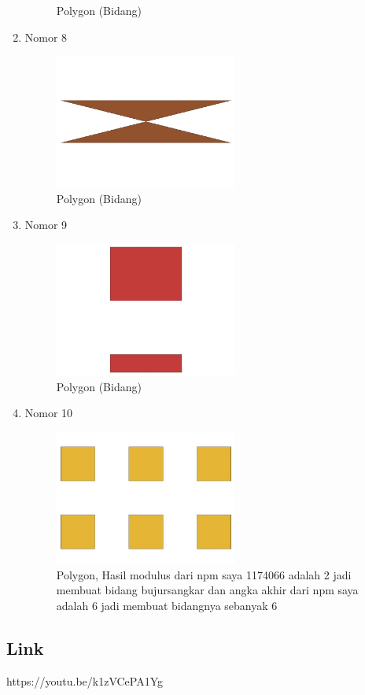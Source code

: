 \begin{enumerate}
\begin{figure}[H]
		\centering
		\caption{Polygon (Bidang)}
	\end{figure}
	\item Nomor 8
	
	\begin{figure}[H]
		\includegraphics[width=6cm]{figures/Tugas2/1174066/No8.jpeg}
		\centering
		\caption{Polygon (Bidang)}
	\end{figure}
	\item Nomor 9
	
	\begin{figure}[H]
		\includegraphics[width=6cm]{figures/Tugas2/1174066/No9.jpeg}
		\centering
		\caption{Polygon (Bidang)}
	\end{figure}
	\item Nomor 10
	
	\begin{figure}[H]
		\includegraphics[width=6cm]{figures/Tugas2/1174066/No10.jpeg}
		\centering
		\caption{Polygon, Hasil modulus dari npm saya 1174066 adalah 2 jadi membuat bidang bujursangkar dan angka akhir dari npm saya adalah 6 jadi membuat bidangnya sebanyak 6}
	\end{figure}
\end{enumerate}
\subsection{Link}
https://youtu.be/k1zVCePA1Yg
